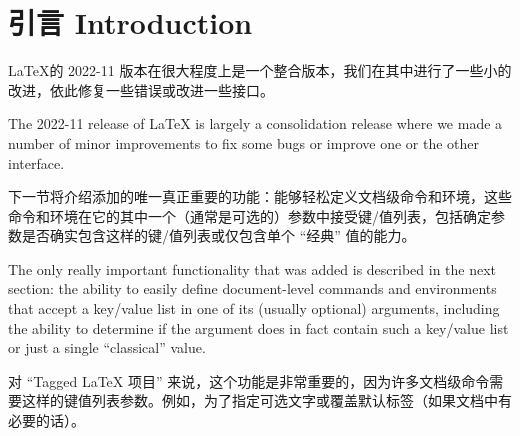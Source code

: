 \documentclass{ltnews}
\makeatletter
\renewcommand{\maketitle}{%
   \twocolumn[{%
      \parbox[t][7\baselineskip]{\textwidth}{%
         \@titlefont\@title\\[\medskipamount]
         \normalfont\normalsize\issuename~\@issue, \@year~年~\@month~月
      }%
   }]%
   \thispagestyle{titlepage}
}
\providecommand\tubcommand[1]{}
\newcommand{\zhquote}[1]{“#1”}
\makeatother
\begin{document}
\tubcommand{\addtolength\textheight{4.2pc}}   %

\maketitle
{  \spaceskip=3.33pt 
\tableofcontents}

\setlength{}

\tubcommand{\addtolength\textheight{4.2pc}}   %

\maketitle
{  \spaceskip=3.33pt 
\tableofcontents}

\setlength{}


\medskip


\section{引言 Introduction}

\LaTeX 的 2022-11 版本在很大程度上是一个整合版本，我们在其中进行了一些小的改进，依此修复一些错误或改进一些接口。

\begin{english}
The 2022-11 release of \LaTeX{} is largely a consolidation release
where we made a number of minor improvements to fix some bugs or
improve one or the other interface.
\end{english}

下一节将介绍添加的唯一真正重要的功能：能够轻松定义文档级命令和环境，这些命令和环境在它的其中一个（通常是可选的）参数中接受键/值列表，包括确定参数是否确实包含这样的键/值列表或仅包含单个 \zhquote{经典} 值的能力。

\begin{english}
The only really important functionality that was added is described in
the next section: the ability to easily define document-level commands
and environments that accept a key/value list in one of its (usually
optional) arguments, including the ability to determine if the argument
does in fact contain such a key/value list or just a single
\enquote{classical} value.
\end{english}

对 \zhquote{Tagged \LaTeX{} 项目} 来说，这个功能是非常重要的，因为许多文档级命令需要这样的键值列表参数。例如，为了指定可选文字或覆盖默认标签（如果文档中有必要的话）。
\end{document}
